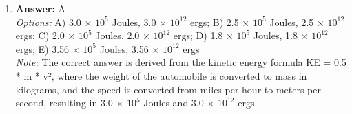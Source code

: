 \documentclass[12pt]{article}
\begin{document}
\begin{enumerate}[label=\arabic*.]
\item \textbf{Answer:} A
\\ \textit{Options:} A) 3.0 \ensuremath{\times} $10^5$ Joules, 3.0 \ensuremath{\times} $10^12$ ergs; B) 2.5 \ensuremath{\times} $10^5$ Joules, 2.5 \ensuremath{\times} $10^12$ ergs; C) 2.0 \ensuremath{\times} $10^5$ Joules, 2.0 \ensuremath{\times} $10^12$ ergs; D) 1.8 \ensuremath{\times} $10^5$ Joules, 1.8 \ensuremath{\times} $10^12$ ergs; E) 3.56 \ensuremath{\times} $10^5$ Joules, 3.56 \ensuremath{\times} $10^12$ ergs
\\ \textit{Note:} The correct answer is derived from the kinetic energy formula KE = 0.5 * m * v², where the weight of the automobile is converted to mass in kilograms, and the speed is converted from miles per hour to meters per second, resulting in 3.0 × $10^5$ Joules and 3.0 × $10^12$ ergs.
\end{enumerate}
\end{document}
